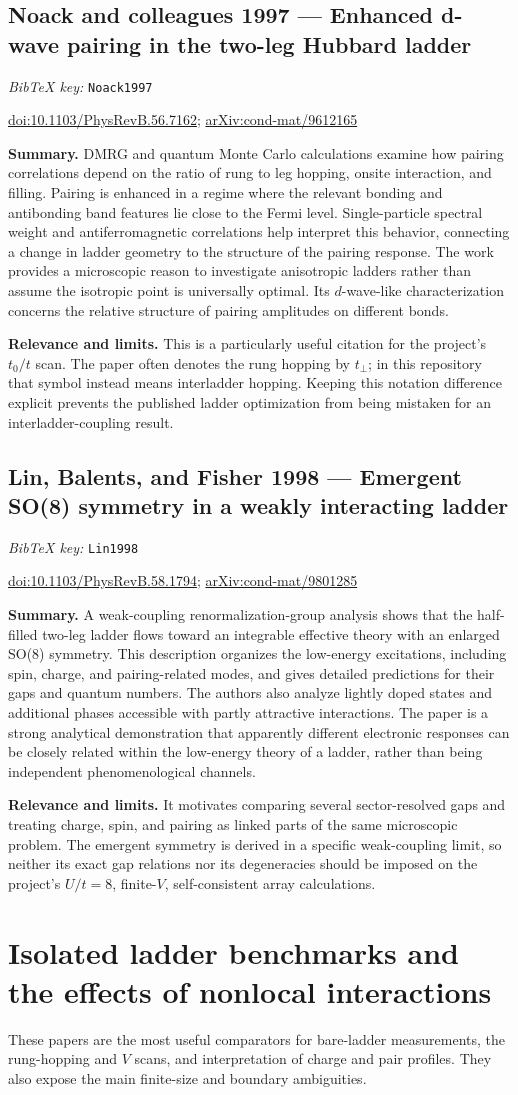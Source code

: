 \documentclass[11pt]{article}
\newcommand{\paper}[2]{\Needspace{8\baselineskip}\subsection{#2}\label{paper:#1}\textit{BibTeX key:} \texttt{#1}\quad\citep{#1}\par}
\newcommand{\doi}[1]{\href{https://doi.org/#1}{doi:#1}}
\newcommand{\arxiv}[1]{\href{https://arxiv.org/abs/#1}{arXiv:#1}}
\newcommand{\summary}{\par\textbf{Summary.} }
\newcommand{\relevance}{\par\textbf{Relevance and limits.} }
\begin{document}
\paper{Noack1997}{Noack and colleagues 1997 --- Enhanced d-wave pairing in the two-leg Hubbard ladder}
\doi{10.1103/PhysRevB.56.7162}; \arxiv{cond-mat/9612165}
\summary DMRG and quantum Monte Carlo calculations examine how pairing correlations depend on the ratio of rung to leg hopping, onsite interaction, and filling. Pairing is enhanced in a regime where the relevant bonding and antibonding band features lie close to the Fermi level. Single-particle spectral weight and antiferromagnetic correlations help interpret this behavior, connecting a change in ladder geometry to the structure of the pairing response. The work provides a microscopic reason to investigate anisotropic ladders rather than assume the isotropic point is universally optimal. Its $d$-wave-like characterization concerns the relative structure of pairing amplitudes on different bonds.
\relevance This is a particularly useful citation for the project's $t_0/t$ scan. The paper often denotes the rung hopping by $t_\perp$; in this repository that symbol instead means interladder hopping. Keeping this notation difference explicit prevents the published ladder optimization from being mistaken for an interladder-coupling result.

\paper{Lin1998}{Lin, Balents, and Fisher 1998 --- Emergent SO(8) symmetry in a weakly interacting ladder}
\doi{10.1103/PhysRevB.58.1794}; \arxiv{cond-mat/9801285}
\summary A weak-coupling renormalization-group analysis shows that the half-filled two-leg ladder flows toward an integrable effective theory with an enlarged SO(8) symmetry. This description organizes the low-energy excitations, including spin, charge, and pairing-related modes, and gives detailed predictions for their gaps and quantum numbers. The authors also analyze lightly doped states and additional phases accessible with partly attractive interactions. The paper is a strong analytical demonstration that apparently different electronic responses can be closely related within the low-energy theory of a ladder, rather than being independent phenomenological channels.
\relevance It motivates comparing several sector-resolved gaps and treating charge, spin, and pairing as linked parts of the same microscopic problem. The emergent symmetry is derived in a specific weak-coupling limit, so neither its exact gap relations nor its degeneracies should be imposed on the project's $U/t=8$, finite-$V$, self-consistent array calculations.

\section{Isolated ladder benchmarks and the effects of nonlocal interactions}
These papers are the most useful comparators for bare-ladder measurements, the rung-hopping and $V$ scans, and interpretation of charge and pair profiles. They also expose the main finite-size and boundary ambiguities.
\end{document}
